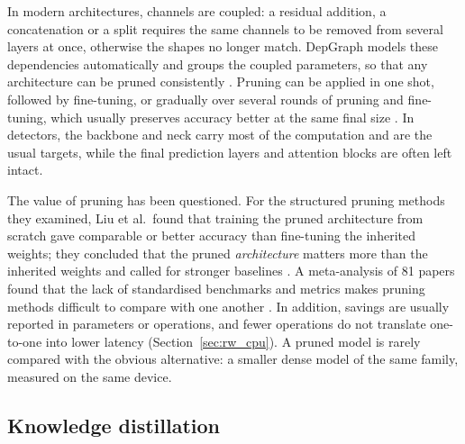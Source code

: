\documentclass[a4paper,11pt,twoside]{report}
\theoremstyle{definition}
\begin{document}
In modern architectures, channels are coupled: a residual addition, a concatenation or a split requires the same channels to be removed from several layers at once, otherwise the shapes no longer match. DepGraph models these dependencies automatically and groups the coupled parameters, so that any architecture can be pruned consistently \cite{Fang2023DepGraph}. Pruning can be applied in one shot, followed by fine-tuning, or gradually over several rounds of pruning and fine-tuning, which usually preserves accuracy better at the same final size \cite{Han2016DeepCompression}. In detectors, the backbone and neck carry most of the computation and are the usual targets, while the final prediction layers and attention blocks are often left intact.

The value of pruning has been questioned. For the structured pruning methods they examined, Liu et al.\ found that training the pruned architecture from scratch gave comparable or better accuracy than fine-tuning the inherited weights; they concluded that the pruned \emph{architecture} matters more than the inherited weights and called for stronger baselines \cite{Liu2019RethinkingPruning}. A meta-analysis of 81 papers found that the lack of standardised benchmarks and metrics makes pruning methods difficult to compare with one another \cite{Blalock2020StatePruning}. In addition, savings are usually reported in parameters or operations, and fewer operations do not translate one-to-one into lower latency (Section~\ref{sec:rw_cpu}). A pruned model is rarely compared with the obvious alternative: a smaller dense model of the same family, measured on the same device.

\subsection{Knowledge distillation}
\label{sec:rw_kd}
\end{document}
